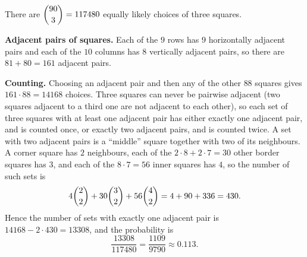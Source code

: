 There are $\dbinom{90}{3}=117480$ equally likely choices of three squares.

\textbf{Adjacent pairs of squares.} Each of the $9$ rows has $9$ horizontally adjacent pairs and each of the $10$ columns has $8$ vertically adjacent pairs, so there are $81+80=161$ adjacent pairs.

\textbf{Counting.} Choosing an adjacent pair and then any of the other $88$ squares gives $161\cdot88=14168$ choices. Three squares can never be pairwise adjacent (two squares adjacent to a third one are not adjacent to each other), so each set of three squares with at least one adjacent pair has either exactly one adjacent pair, and is counted once, or exactly two adjacent pairs, and is counted twice. A set with two adjacent pairs is a ``middle'' square together with two of its neighbours. A corner square has $2$ neighbours, each of the $2\cdot8+2\cdot7=30$ other border squares has $3$, and each of the $8\cdot7=56$ inner squares has $4$, so the number of such sets is
\[4\dbinom22+30\dbinom32+56\dbinom42=4+90+336=430.\]
Hence the number of sets with exactly one adjacent pair is $14168-2\cdot430=13308$, and the probability is
\[\dfrac{13308}{117480}=\boxed{\dfrac{1109}{9790}}\approx0.113.\]
